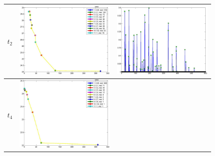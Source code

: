 \documentclass[11pt]{article}
\begin{document}
{\begin{figure}[!h]
\begin{center}
\begin{tabular}{|c|c|c|}
			\hline
			$t_2$
			&	
			\includegraphics[width=.8\iwidth]{figures/newFigs/exp3paretoWeights}
			&
			\includegraphics[width=.8\iwidth]{figures/newFigs/exp3Weights}\\
			\hline
			$t_4$
			&	
			\includegraphics[width=.8\iwidth]{figures/newFigs/exp5paretoWeights}

\end{tabular}
\end{center}
\end{figure}}
\end{document}
